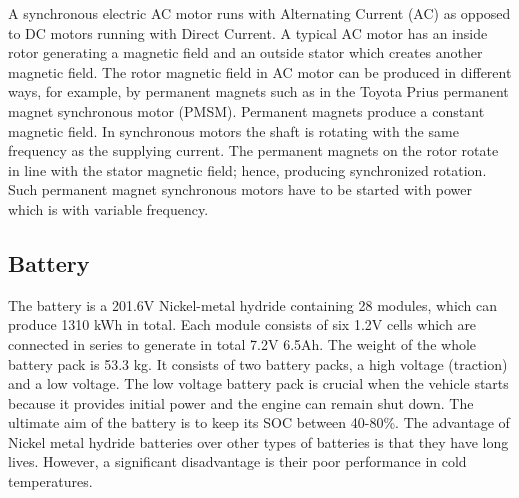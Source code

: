 A synchronous electric AC motor runs with Alternating Current (AC) as opposed to DC motors running with Direct Current. A typical AC motor has an inside rotor generating a magnetic field and an outside stator which creates another magnetic field. The rotor magnetic field in AC motor can be produced in different ways, for example, by permanent magnets such as in the Toyota Prius permanent magnet synchronous motor (PMSM). Permanent magnets produce a constant magnetic field. In synchronous motors the shaft is rotating with the same frequency as the supplying current. The permanent magnets on the rotor rotate in line with the stator magnetic field; hence, producing synchronized rotation. Such permanent magnet synchronous motors have to be started with power which is with variable frequency.

\subsection{Battery}
The battery is a 201.6V Nickel-metal hydride containing 28 modules, which can produce 1310 kWh in total. Each module consists of six 1.2V cells which are connected in series to generate in total 7.2V 6.5Ah. The weight of the whole battery pack is 53.3 kg. It consists of two battery packs, a high voltage (traction) and a low voltage. The low voltage battery pack is crucial when the vehicle starts because it provides initial power and the engine can remain shut down. The ultimate aim of the battery is to keep its SOC between 40-80\%. The advantage of Nickel metal hydride batteries over other types of batteries is that they have long lives. However, a significant disadvantage is their poor performance in cold temperatures. 

